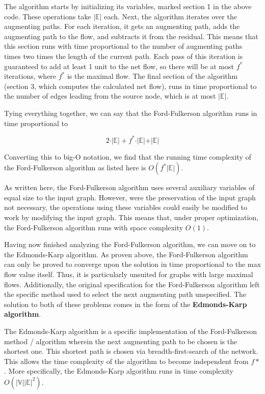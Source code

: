 \documentclass[12pt]{amsart}
\begin{document}
    The algorithm starts by initializing its variables, marked
    section 1 in the above code. These operations take
    $\vert \mathbb{E} \vert$ each. Next, the algorithm iterates
    over the augmenting paths. For each iteration, it gets an
    augmenting path, adds the augmenting path to the flow, and
    subtracts it from the residual. This means that this section
    runs with time proportional to the number of augmenting
    paths times two times the length of the current path. Each
    pass of this iteration is guaranteed to add at least 1 unit
    to the net flow, so there will be at most $f^*$ iterations,
    where $f^*$ is the maximal flow. The final section of the
    algorithm (section 3, which computes the calculated net
    flow), runs in time proportional to the number of edges
    leading from the source node, which is at most
    $\vert \mathbb{E} \vert$.

    Tying everything together, we can say that the
    Ford-Fulkerson algorithm runs in time proportional to

\[
    2 \cdot \vert \mathbb{E} \vert + f^* \cdot \vert \mathbb{E}
        \vert + \vert \mathbb{E} \vert
\]

    Converting this to big-O notation, we find that the running
    time complexity of the Ford-Fulkerson algorithm as listed
    here is $O(f^* \vert \mathbb{E} \vert )$.

    As written here, the Ford-Fulkerson algorithm uses several
    auxiliary variables of equal size to the input graph.
    However, were the preservation of the input graph not
    necessary, the operations using these variables could easily
    be modified to work by modifying the input graph. This
    means that, under proper optimization, the Ford-Fulkerson
    algorithm runs with space complexity $O(1)$.

    Having now finished analyzing the Ford-Fulkerson algorithm,
    we can move on to the Edmonds-Karp algorithm. As proven
    above, the Ford-Fulkerson algorithm can only be proved to
    converge upon the solution in time proportional to the max
    flow value itself. Thus, it is particularly unsuited for
    graphs with large maximal flows. Additionally, the original
    specification for the Ford-Fulkerson algorithm left the
    specific method used to select the next augmenting path
    unspecified. The solution to both of these problems comes
    in the form of the \textbf{Edmonds-Karp algorithm}.

    The Edmonds-Karp algorithm is a specific implementation of
    the Ford-Fulkerson method / algorithm wherein the next
    augmenting path to be chosen is the shortest one. This
    shortest path is chosen via breadth-first-search of the
    network. This allows the time complexity of the algorithm
    to become independent from $f*$. More specifically, the
    Edmonds-Karp algorithm runs in time complexity
    $O(\vert \mathbb{V} \vert \vert \mathbb{E} \vert ^2)$.
\end{document}
